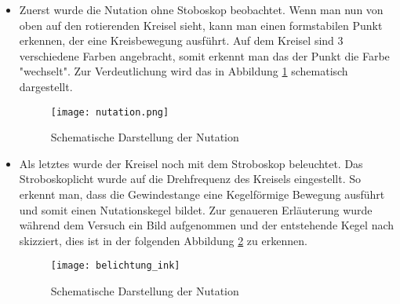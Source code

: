 \begin{itemize}
\item Zuerst wurde die Nutation ohne Stoboskop beobachtet. Wenn man nun von oben auf den rotierenden Kreisel sieht, kann man einen formstabilen Punkt erkennen, der eine Kreisbewegung ausführt. Auf dem Kreisel sind 3 verschiedene Farben angebracht, somit erkennt man das der Punkt die Farbe "wechselt". Zur Verdeutlichung wird das in Abbildung \ref{img:Nutation} schematisch dargestellt. 
\begin{figure}[h]
\begin{center}
	\texttt{[image: nutation.png]}
	\caption{Schematische Darstellung der Nutation}
	\label{img:Nutation}
\end{center}
\end{figure}

\item Als letztes wurde der Kreisel noch mit dem Stroboskop beleuchtet. Das Stroboskoplicht wurde auf die Drehfrequenz des Kreisels eingestellt. So erkennt man, dass die Gewindestange eine Kegelförmige Bewegung ausführt und somit einen Nutationskegel bildet. Zur genaueren Erläuterung wurde während dem Versuch ein Bild aufgenommen und der entstehende Kegel nach skizziert, dies ist in der folgenden Abbildung \ref{img:belichtung} zu erkennen. 
\begin{figure}[h]
\begin{center}
	\texttt{[image: belichtung\_ink]}
	\caption{Schematische Darstellung der Nutation}
	\label{img:belichtung}
\end{center}
\end{figure}

\end{itemize}




